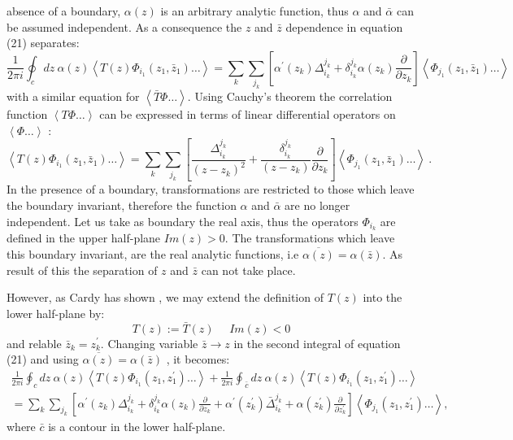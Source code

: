 absence of a boundary, $\alpha(z)$ is an arbitrary analytic function, thus 
$\alpha$ and $\bar{\alpha}$ can be assumed independent. As a consequence
the $z$ and $\bar{z}$ dependence in equation (21) separates:
\begin{equation}
\frac 1{2\pi i}\oint_{c}dz\:\alpha(z)\left<T(z)\Phi_{i_{1}}(z_{1},{\bar{z}}_{1})
\ldots\right>
=\sum_{k}\sum_{j_{k}}\left[\alpha^{\prime}(z_{k})\Delta^{j_{k}}_{i_{k}}+
\delta^{j_{k}}_{i_{k}}\alpha(z_{k}) \frac {\partial}{\partial{z_{k}}}\right]
\left<\Phi_{j_{1}}(z_{1},{\bar{z}}_{1})\ldots\right>
\end{equation}
with a similar equation for $\left<\bar{T}\Phi\ldots\right>$. Using Cauchy's theorem
the correlation function $\left<T\Phi\ldots\right>$ can be expressed in terms of linear
differential operators on $\left<\Phi\ldots\right>$ :
\begin{equation}
\left<T(z)\Phi_{i_{1}}(z_{1},{\bar{z}}_{1})\ldots\right>=\sum_{k}\sum_{j_{k}}
\left[\frac {\Delta^{j_{k}}_{i_{k}}}{(z-z_{k})^{2}}
+\frac {\delta^{j_{k}}_{i_{k}}}{(z-z_{k})}\frac {\partial}{\partial{z_{k}}}\right]
\left<\Phi_{j_{1}}(z_{1},{\bar{z}}_{1})\ldots\right>\:.
\end{equation}
In the presence of a boundary, transformations are restricted to those which leave
the boundary invariant, therefore the function $\alpha$ and $\bar{\alpha}$
are no longer independent. Let us take as boundary the real axis, thus the operators
$\Phi_{i_{k}}$ are defined in the upper half-plane $Im(z)>0$.
The transformations which leave this boundary invariant, are the real analytic functions,
i.e $\overline{\alpha(z)}=\alpha(\bar{z})$.
As result of this the separation of $z$ and $\bar{z}$ can not take place.

However, as Cardy has shown \cite{Cardy}, we may extend the definition of $T(z)$ into the lower
half-plane by:
\begin{equation}
T(z):=\bar{T}(z)\:\:\:\:\:\: Im(z)<0
\end{equation}
and relable ${\bar{z}}_{k}=z^{\prime}_{k}$. Changing variable $\bar{z}\rightarrow z$
in the second integral of equation (21) and using $\overline{\alpha(z)}=\alpha(\bar{z})$ ,
it becomes:
\begin{eqnarray}
\frac 1{2\pi i}{\oint}_{c}dz\:\alpha(z)\left<T(z)\Phi_{i_{1}}(z_{1},
z^{\prime}_{1})\ldots\right>+\frac 1{2\pi i}\oint_{\:\bar{c}}
dz\:\alpha(z)\left<T(z){\Phi}_{i_{1}}(z_{1},z^{\prime}_{1})\ldots\right>
\nonumber\\
=\sum_{k}\sum_{j_{k}}\left[{\alpha}^{\prime}(z_{k})\Delta^{j_{k}}_{i_{k}}+
\delta^{j_{k}}_{i_{k}}\alpha(z_{k})\frac {\partial}{\partial{z_{k}}}+
{\alpha}^{\prime}(z^{\prime}_{k}){\bar{\Delta}}^{j_{k}}_{i_{k}}
+\alpha(z^{\prime}_{k})\frac {\partial}{\partial{z^{\prime}_{k}}}\right]
\left<\Phi_{j_{1}}(z_{1},z^{\prime}_{1})\ldots\right> ,
\end{eqnarray}
where $\bar{c}$ is a contour in the lower half-plane\cite{Cardy}.

